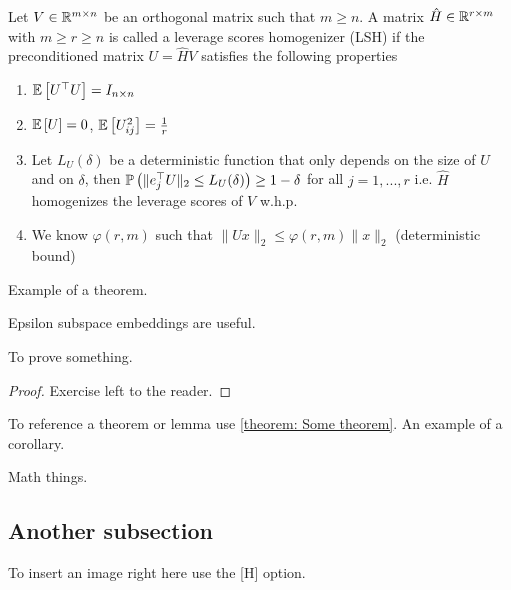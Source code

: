 \documentclass{article}
\begin{document}
\begin{definition}
\label{def: Leverage scores homogenizers (LSH)}
    Let $V \in {\ensuremath{\mathbb{R}}}^{m \times n}$ be an orthogonal matrix such that $m \geq n$. A matrix $\hat{H} \in {\ensuremath{\mathbb{R}}}^{r \times m}$ with $ m \geq r \geq n$ is called a leverage scores homogenizer (LSH) if the preconditioned matrix $U = \hat{H}V$ satisfies the following properties
    \begin{enumerate}
        \item ${\mathbb{E}\left[U^{\top}U\right]} = I_{n \times n}$
        \item ${\mathbb{E}\left[U\right]} = 0$, ${\mathbb{E}\left[U_{ij}^{2}\right]} = \frac{1}{r}$
        \item Let $L_{U}(\delta)$ be a deterministic function that only depends on the size of $U$ and on $\delta$, then ${\mathbb{P}\left( \| e_{j}^{\top} U \|_2 \leq L_{U}(\delta) \right)} \geq 1 - \delta$ for all $j = 1, ..., r$ i.e. $\hat{H}$ homogenizes the leverage scores of $V$ w.h.p.
        \item We know $\varphi(r, m)$ such that $\|Ux\|_2 \leq \varphi(r, m) \|x\|_2$ (deterministic bound)
    \end{enumerate}
\end{definition} 

Example of a theorem.

\begin{theorem}
\label{theorem: Some theorem}
    Epsilon subspace embeddings are useful.
\end{theorem}

To prove something.

\begin{proof}
    Exercise left to the reader.
\end{proof}

To reference a theorem or lemma use \cref{theorem: Some theorem}. An example of a corollary.

\begin{corollary}[A corollary]
    \label{corollary: A corollary}
    Math things.
\end{corollary}


\subsection{Another subsection}
 
To insert an image right here use the [H] option.
\end{document}
